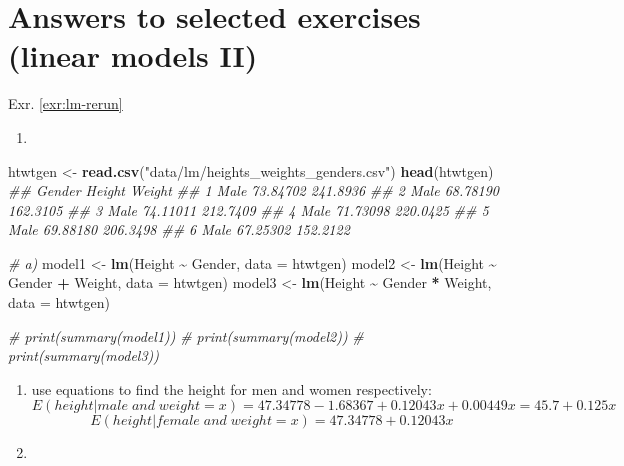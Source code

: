 \documentclass[
]{book}
\newenvironment{Shaded}{\begin{snugshade}}{\end{snugshade}}
\newcommand{\CommentTok}[1]{\textcolor[rgb]{0.56,0.35,0.01}{\textit{#1}}}
\newcommand{\DataTypeTok}[1]{\textcolor[rgb]{0.13,0.29,0.53}{#1}}
\newcommand{\KeywordTok}[1]{\textcolor[rgb]{0.13,0.29,0.53}{\textbf{#1}}}
\newcommand{\NormalTok}[1]{#1}
\newcommand{\OperatorTok}[1]{\textcolor[rgb]{0.81,0.36,0.00}{\textbf{#1}}}
\newcommand{\StringTok}[1]{\textcolor[rgb]{0.31,0.60,0.02}{#1}}
\providecommand{\tightlist}{%
  \setlength{\itemsep}{0pt}\setlength{\parskip}{0pt}}
\theoremstyle{definition}
\theoremstyle{definition}
\theoremstyle{definition}
\theoremstyle{remark}
\begin{document}
\hypertarget{answers-to-selected-exercises-linear-models-ii}{%
\section*{Answers to selected exercises (linear models II)}\label{answers-to-selected-exercises-linear-models-ii}}

Exr. \ref{exr:lm-rerun}

\begin{enumerate}
\def\labelenumi{\alph{enumi})}
\tightlist
\item
\end{enumerate}

\begin{Shaded}
\begin{Highlighting}[]
\NormalTok{htwtgen \textless{}{-}}\StringTok{ }\KeywordTok{read.csv}\NormalTok{(}\StringTok{"data/lm/heights\_weights\_genders.csv"}\NormalTok{)}
\KeywordTok{head}\NormalTok{(htwtgen)}
\CommentTok{\#\#   Gender   Height   Weight}
\CommentTok{\#\# 1   Male 73.84702 241.8936}
\CommentTok{\#\# 2   Male 68.78190 162.3105}
\CommentTok{\#\# 3   Male 74.11011 212.7409}
\CommentTok{\#\# 4   Male 71.73098 220.0425}
\CommentTok{\#\# 5   Male 69.88180 206.3498}
\CommentTok{\#\# 6   Male 67.25302 152.2122}

\CommentTok{\# a)}
\NormalTok{model1 \textless{}{-}}\StringTok{ }\KeywordTok{lm}\NormalTok{(Height }\OperatorTok{\textasciitilde{}}\StringTok{ }\NormalTok{Gender, }\DataTypeTok{data =}\NormalTok{ htwtgen)}
\NormalTok{model2 \textless{}{-}}\StringTok{ }\KeywordTok{lm}\NormalTok{(Height }\OperatorTok{\textasciitilde{}}\StringTok{ }\NormalTok{Gender }\OperatorTok{+}\StringTok{ }\NormalTok{Weight, }\DataTypeTok{data =}\NormalTok{ htwtgen)}
\NormalTok{model3 \textless{}{-}}\StringTok{ }\KeywordTok{lm}\NormalTok{(Height }\OperatorTok{\textasciitilde{}}\StringTok{ }\NormalTok{Gender }\OperatorTok{*}\StringTok{ }\NormalTok{Weight, }\DataTypeTok{data =}\NormalTok{ htwtgen)}

\CommentTok{\# print(summary(model1))}
\CommentTok{\# print(summary(model2))}
\CommentTok{\# print(summary(model3))}
\end{Highlighting}
\end{Shaded}

\begin{enumerate}
\def\labelenumi{\alph{enumi})}
\setcounter{enumi}{1}
\item
  use equations to find the height for men and women respectively:
  \[E(height|male\; and \; weight=x)=47.34778 - 1.68367 + 0.12043x + 0.00449x = 45.7 + 0.125x\]
  \[E(height|female\; and \; weight=x)=47.34778 + 0.12043x\]
\item
\end{enumerate}
\end{document}
